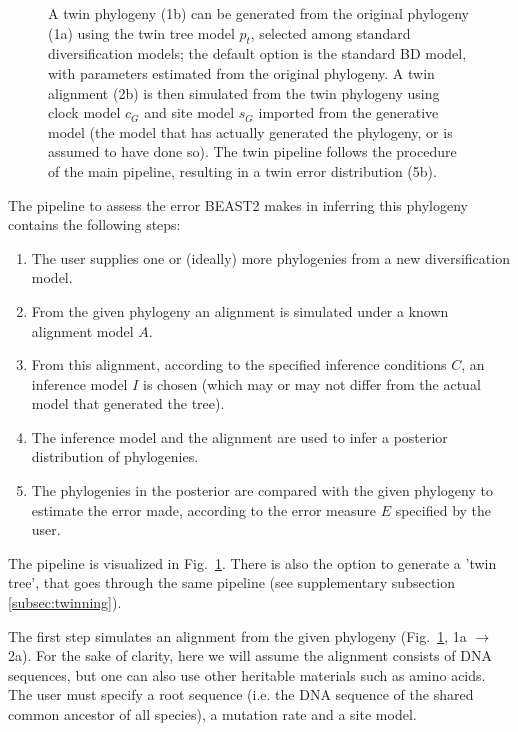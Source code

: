 \begin{figure}
{    A twin phylogeny (1b) can be generated from the original 
    phylogeny (1a) using the twin tree model $\mathit{p_{t}}$, 
    selected among standard diversification models; 
    the default option is the standard BD model, 
    with parameters estimated from the original phylogeny.
    A twin alignment (2b) is then simulated from the twin phylogeny 
    using clock model $\mathit{c_{G}}$ and site model $\mathit{s_{G}}$ 
    imported from the generative model (the model that has
    actually generated the phylogeny, or is assumed to have done so). 
    The twin pipeline follows the procedure of the main pipeline, 
    resulting in a twin error distribution (5b).
  }
  \label{fig:pipeline}
\end{figure}

The pipeline to assess the error BEAST2 makes in inferring this phylogeny 
contains the following steps:
\begin{enumerate}
  \item The user supplies one or (ideally) more phylogenies from a 
    new diversification model.
  \item From the given phylogeny an alignment is simulated 
    under a known alignment model $\mathit{A}$.
  \item From this alignment, according to the specified 
    inference conditions $\mathit{C}$, 
    an inference model $\mathit{I}$ is chosen (which may or may not differ 
    from the actual model that generated the tree).
  \item The inference model and the alignment are used 
    to infer a posterior distribution of phylogenies.
  \item The phylogenies in the posterior are compared with the given phylogeny 
    to estimate the error made, according to 
    the error measure $\mathit{E}$ specified by the user.
\end{enumerate}

The pipeline is visualized in Fig.~\ref{fig:pipeline}. 
There is also the option to generate a 'twin tree', 
that goes through the same pipeline (see supplementary subsection \ref{subsec:twinning}). 

The first step simulates an alignment from the given 
phylogeny (Fig.~\ref{fig:pipeline}, 1a $\rightarrow$ 2a).
For the sake of clarity, here we will assume the alignment consists
of DNA sequences, but one can also use other heritable materials such as amino acids.
The user must specify a root sequence (i.e. the DNA sequence of the shared 
common ancestor of all species), a mutation rate and a site model.

